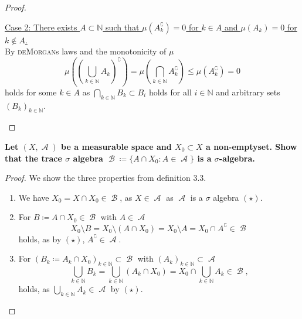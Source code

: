 \documentclass{article}
\DeclareMathOperator{\A}{\mathcal{A}}
\DeclareMathOperator{\B}{\mathcal{B}}
\renewcommand{\c}{\complement}
\newcommand{\N}{\mathbb{N}} %
\begin{document}
\begin{proof}
\begin{enumerate}[label = (\roman*)]
        \underline{Case 2: There exists $A \subset \N$ such that $\mu(A_k^{\c}) = 0$ for $k \in A$ and $\mu(A_k) = 0$ for $k \not\in A$.} \\
        By \textsc{deMorgan}s laws and the monotonicity of $\mu$
        \begin{equation*}
            \mu\left(\left(\bigcup_{k \in \N} A_k\right)^{\c} \right)
            = \mu\left(\bigcap_{k \in \N} A_k^{\c} \right)
            \le \mu(A_k^{\c})
            = 0
        \end{equation*}
        holds for some $k \in A$ as $\bigcap_{k \in \N} B_k \subset B_i$ holds for all $i \in \N$ and arbitrary sets $(B_k)_{k \in \N}$.
    \end{enumerate}
\end{proof}

\textbf{
    Let $(X, \A)$ be a measurable space and $X_0 \subset X$ a non-emptyset.
    Show that the trace $\sigma$ algebra $\B \coloneqq \big\{A \cap X_0: A \in \A \big\}$ is a $\sigma$-algebra.
}

\begin{proof}
    We show the three properties from definition 3.3.
    \begin{enumerate}[label = (\roman*)]
        \item
        We have $X_0 = X \cap X_0 \in \B$, as $X \in \A$ as $\A$ is a $\sigma$ algebra $(\star)$.
        
        \item
        For $B \coloneqq A \cap X_0 \in \B$ with $A \in \A$
        \begin{equation*}
            X_0 \setminus B
            = X_0 \setminus (A \cap X_0)
            = X_0 \setminus A 
            = X_0 \cap A^{\c} \in \B
        \end{equation*}
        holds, as by $(\star)$, $A^{\c} \in \A$.
        
        \item
        For $(B_k \coloneqq A_k \cap X_0)_{k \in \N} \subset \B$ with $(A_k)_{k \in \N} \subset \A$
        \begin{equation*}
            \bigcup_{k \in \N} B_k
            = \bigcup_{k \in \N} (A_k \cap X_0)
            = X_0 \cap \bigcup_{k \in \N} A_k
            \in \B,
        \end{equation*}
        holds, as $\bigcup_{k \in \N} A_k \in \A$ by $(\star)$.
    \end{enumerate}
\end{proof}
\end{document}

